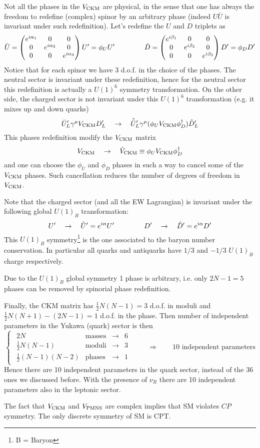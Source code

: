 \documentclass[TheoreticalPhy_ModB.tex]{subfiles}
\begin{document}
Not all the phases in the $V_{\text{CKM}}$ are physical, in the sense that one has always the freedom to redefine (complex) spinor by an arbitrary phase (indeed $U\bar U$ is invariant under such redefinition).
Let's redefine the $U$ and $D$ triplets as
\[\begin{aligned}
\hat U=\begin{pmatrix}e^{i\alpha_1}&0&0\\0&e^{i\alpha_2}&0\\0&0&e^{i\alpha_3}\end{pmatrix}U'=\phi_UU'
\hspace{1.5cm}
\hat D=\begin{pmatrix}e^{i\beta_1}&0&0\\0&e^{i\beta_2}&0\\0&0&e^{i\beta_3}\end{pmatrix}D'=\phi_DD'
\end{aligned}\]
Notice that for each spinor we have 3 d.o.f. in the choice of the phases. The neutral sector is invariant under these redefinition, hence for the neutral sector this redefinition is actually a $U(1)^6$ symmetry transformation. On the other side, the charged sector is not invariant under this $U(1)^6$ transformation (e.g. it mixes up and down quarks)
\[\bar U_L'\gamma^\mu V_{\text{CKM}} D_L'\quad\to\quad\hat{\bar U}_L'\gamma^\mu (\phi_UV_{\text{CKM}}\phi_D^\dagger)\hat D_L'\]
This phases redefinition modify the $V_{\text{CKM}}$ matrix
\[V_{\text{CKM}}\quad\to\quad\hat V_{\text{CKM}}\equiv\phi_UV_{\text{CKM}}\phi_D^\dagger\]
and one can choose the $\phi_U$ and $\phi_D$ phases in such a way to cancel some of the $V_{\text{CKM}}$ phases. Such cancellation reduces the number of degrees of freedom in $V_{\text{CKM}}$.  

Note that the charged sector (and all the EW Lagrangian) is invariant under the following global $U(1)_B$ transformation:
\[U'\quad\to\quad\hat U'=e^{i\alpha}U'
\hspace{1.5cm}
D'\quad\to\quad\hat D'=e^{i\alpha}D'\]
This $U(1)_B$ symmetry\footnote{B = Baryon} is the one associated to the baryon number conservation. In particular all quarks and antiquarks have $1/3$ and $-1/3$ $U(1)_B$ charge respectively.

Due to the $U(1)_B$ global symmetry 1 phase is arbitrary, i.e. only $2N-1=5$ phases can be removed by spinorial phase redefinition. 

Finally, the CKM matrix has $\frac12N(N-1)=3$ d.o.f. in moduli and $\frac12N(N+1)-(2N-1)=1$ d.o.f. in the phase. 
Then number of independent parameters in the Yukawa (quark) sector is then 
\[\begin{cases}\begin{matrix}
2N&\text{masses}&\to&6\\
\frac12N(N-1)&\text{moduli}&\to&3\\
\frac12(N-1)(N-2)&\text{phases}&\to&1
\end{matrix}\end{cases}
\qquad\Longrightarrow\qquad 10\text{ independent parameters}
\]
Hence there are 10 independent parameters in the quark sector, instead of the 36 ones we discussed before. 
With the presence of $\nu_R$ there are 10 independent parameters also in the leptonic sector.

The fact that $V_{\text{CKM}}$ and $V_{\text{PMNS}}$ are complex implies that SM violates  $CP$ symmetry. The only discrete symmetry of SM is CPT. 
\end{document}
